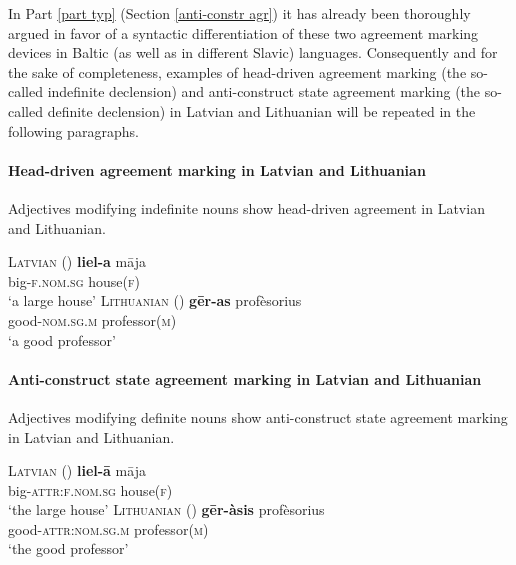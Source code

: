 In Part \ref{part typ} (Section \ref{anti-constr agr}) it has already been thoroughly argued in favor of a syntactic differentiation of these two agreement marking devices in Baltic (as well as in different Sla\-vic) languages. Consequently and for the sake of completeness, examples of head-driven agreement marking (the so-called indefinite declension) and anti-construct state agreement marking (the so-called definite declension) in Latvian and Lithuanian will be repeated in the following paragraphs.

\paragraph{Head-driven agreement marking in Latvian and Lithuanian} 
Adjectives modifying indefinite nouns show head-driven agreement in Latvian and Lithuanian.

\begin{exe}
\ex 
\begin{xlist}
\ex	\textsc{Latvian} (\citealt[115]{dahl2007})
\gll 	\textbf{liel-a} māja\\
	big-\textsc{f.nom.sg} house(\textsc{f})\\
\glt	‘a large house’
\ex \textsc{Lithuanian} (\citealt[13]{bechert1993})
\gll 	\textbf{gēr-as}			profèsorius\\
	good-\textsc{nom.sg.m} professor(\textsc{m})\\
\glt	‘a good professor’
\end{xlist}
\end{exe}
\paragraph{Anti-construct state agreement marking in Latvian and Lithuanian}
Adjectives modifying definite nouns show anti-construct state agreement marking in Latvian and Lithuanian.
\begin{exe}
\ex 
\begin{xlist}	
\ex	\textsc{Latvian} (\citealt[115]{dahl2007})
\gll 	\textbf{liel-ā} māja\\
	big-\textsc{attr:f.nom.sg} house(\textsc{f})\\
\glt	‘the large house’
\ex \textsc{Lithuanian} (\citealt[13]{bechert1993})
\gll 	\textbf{gēr-àsis}		profèsorius\\
	good-\textsc{attr:nom.sg.m}	professor(\textsc{m})\\
\glt	‘the good professor’
\end{xlist}
\end{exe}

